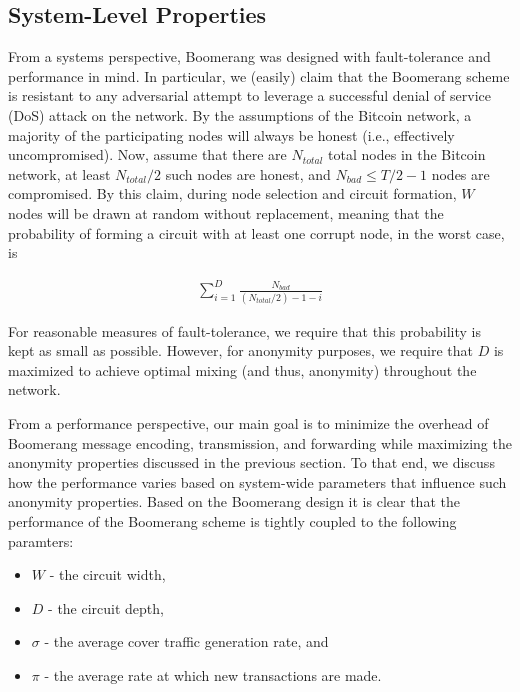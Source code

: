 \subsection{System-Level Properties}
From a systems perspective, Boomerang was designed with fault-tolerance and performance in mind. In particular, we (easily) claim that the Boomerang scheme is resistant to any adversarial attempt to leverage a successful denial of service (DoS) attack on the network. By the assumptions of the Bitcoin network, a majority of the participating nodes will always be honest (i.e., effectively uncompromised). Now, assume that there are $N_{total}$ total nodes in the Bitcoin network, at least $N_{total}/2$ such nodes are honest, and $N_{bad} \leq T/2 - 1$ nodes are compromised. By this claim, during node selection and circuit formation, $W$ nodes will be drawn at random without replacement, meaning that the probability of forming a circuit with at least one corrupt node, in the worst case, is

\begin{align*}
\sum_{i=1}^D \frac{N_{bad}}{(N_{total}/2) - 1 - i}
\end{align*}

For reasonable measures of fault-tolerance, we require that this probability is kept as small as possible. However, for anonymity purposes, we require that $D$ is maximized to achieve optimal mixing (and thus, anonymity) throughout the network. 


From a performance perspective, our main goal is to minimize the overhead of Boomerang message encoding, transmission, and forwarding while maximizing the anonymity properties discussed in the previous section. To that end, we discuss how the performance varies based on system-wide parameters that influence such anonymity properties. Based on the Boomerang design it is clear that the performance of the Boomerang scheme is tightly coupled to the following paramters:
\begin{itemize}
	\item $W$ - the circuit width,
	\item $D$ - the circuit depth,
	\item $\sigma$ - the average cover traffic generation rate, and
	\item $\pi$ - the average rate at which new transactions are made.
\end{itemize}



